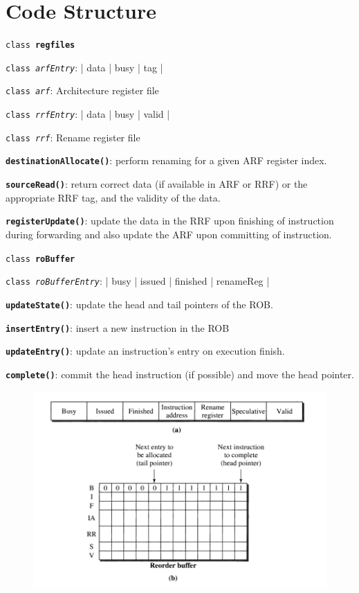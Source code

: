 \documentclass[12pt,a4paper,english]{paper}
\begin{document}
\section{Code Structure}
        \begin{compactitem}
        \item \texttt{class \textbf{regfiles}}
        \begin{compactitem}
            \item \texttt{class \textit{arfEntry}}: | data | busy | tag |
            \item \texttt{class \textit{arf}}: Architecture register file
            \item \texttt{class \textit{rrfEntry}}: | data | busy | valid |
            \item \texttt{class \textit{rrf}}: Rename register file
            \item \texttt{\textbf{destinationAllocate()}}: perform renaming for a given ARF register index.
            \item \texttt{\textbf{sourceRead()}}: return correct data (if available in ARF or RRF) or the appropriate RRF tag, and the validity of the data.
            \item \texttt{\textbf{registerUpdate()}}: update the data in the RRF upon finishing of instruction during forwarding and also update the ARF upon committing of instruction.
        \end{compactitem}
        \item \texttt{class \textbf{roBuffer}}
        \begin{compactitem}
            \item \texttt{class \textit{roBufferEntry}}: | busy | issued | finished | renameReg |
            \item \texttt{\textbf{updateState()}}: update the head and tail pointers of the ROB.
            \item \texttt{\textbf{insertEntry()}}: insert a new instruction in the ROB
            \item \texttt{\textbf{updateEntry()}}: update an instruction's entry on execution finish.
            \item \texttt{\textbf{complete()}}: commit the head instruction (if possible) and move the head pointer.
        \end{compactitem}
\begin{figure}[H]
    \centering
    \includegraphics[scale=0.7]{RoB.png}

\end{figure}
\end{compactitem}
\end{document}
